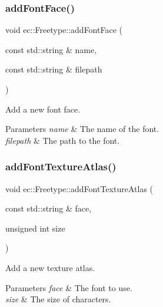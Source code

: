 \subsubsection{\texorpdfstring{add\+Font\+Face()}{addFontFace()}}
{\footnotesize\ttfamily void ec\+::\+Freetype\+::add\+Font\+Face (\begin{DoxyParamCaption}\item[{const std\+::string \&}]{name,  }\item[{const std\+::string \&}]{filepath }\end{DoxyParamCaption})}



Add a new font face. 


\begin{DoxyParams}{Parameters}
{\em name} & The name of the font. \\
\hline
{\em filepath} & The path to the font. \\
\hline
\end{DoxyParams}
\mbox{\label{classec_1_1_freetype_a1be4b69e2d57689533ddaabdc9042d51}} 
\subsubsection{\texorpdfstring{add\+Font\+Texture\+Atlas()}{addFontTextureAtlas()}}
{\footnotesize\ttfamily void ec\+::\+Freetype\+::add\+Font\+Texture\+Atlas (\begin{DoxyParamCaption}\item[{const std\+::string \&}]{face,  }\item[{unsigned int}]{size }\end{DoxyParamCaption})}



Add a new texture atlas. 


\begin{DoxyParams}{Parameters}
{\em face} & The font to use. \\
\hline
{\em size} & The size of characters. \\
\hline
\end{DoxyParams}
\mbox{\label{classec_1_1_freetype_a3e0a8937ec0ceb33495598da59b2c4f3}} 
